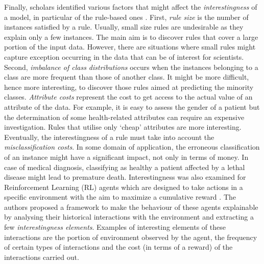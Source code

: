 \documentclass[final,1p,times]{elsarticle}
\begin{document}
Finally, scholars identified various factors that might affect the \textit{interestingness} of a model, in particular of the rule-based ones \cite{freitas1999rule, freitas2006we}. First, \textit{rule size} is the number of instances satisfied by a rule. Usually, small size rules are undesirable as they explain only a few instances. The main aim is to discover rules that cover a large portion of the input data. However, there are situations where small rules might capture exception occurring in the data that can be of interest for scientists. Second, \textit{imbalance of class distributions} occurs when the instances belonging to a class are more frequent than those of another class. It might be more difficult, hence more interesting, to discover those rules aimed at predicting the minority classes. \textit{Attribute costs} represent the cost to get access to the actual value of an attribute of the data. For example, it is easy to assess the gender of a patient but the determination of some health-related attributes can require an expensive investigation. Rules that utilise only `cheap' attributes are more interesting. Eventually, the interestingness of a rule must take into account the \textit{misclassification costs}. In some domain of application, the erroneous classification of an instance might have a significant impact, not only in terms of money. In case of medical diagnosis, classifying as healthy a patient affected by a lethal disease might lead to premature death. Interestingness was also examined for Reinforcement Learning (RL) agents which are designed to take actions in a specific environment with the aim to maximize a cumulative reward \cite{sequeira2019interestingness}.
The authors proposed a framework to make the behaviour of these agents explainable by analysing their historical interactions with the environment and extracting a few \textit{interestingness elements}. Examples of interesting elements of these interactions are the portion of environment observed by the agent, the frequency of certain types of interactions and the cost (in terms of a reward) of the interactions carried out.
\end{document}
